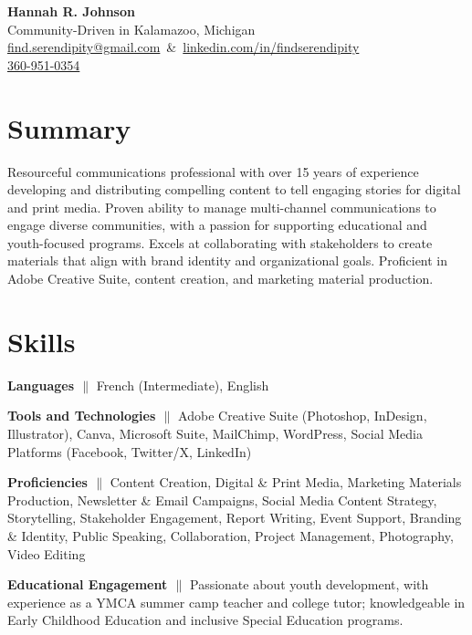 \documentclass[a4paper,12pt]{article} %
\begin{document}
      \begin{center} %
      {\LARGE \textbf{Hannah R. Johnson}} \\
      Community-Driven in Kalamazoo, Michigan \\
      \mbox{\href{mailto:find.serendipity@gmail.com}{find.serendipity@gmail.com} \&
            \href{https://www.linkedin.com/in/findserendipity/}{linkedin.com/in/findserendipity}}\\
      \href{tel:360-951-0354}{360-951-0354}

\end{center}

\section{Summary }
\noindent
Resourceful communications professional with over 15 years of experience developing and distributing compelling content to tell engaging stories for digital and print media. Proven ability to manage multi-channel communications to engage diverse communities, with a passion for supporting educational and youth-focused programs. Excels at collaborating with stakeholders to create materials that align with brand identity and organizational goals. Proficient in Adobe Creative Suite, content creation, and marketing material production.

\section{Skills}
\textbf{Languages {$\parallel$}} \small{{ French (Intermediate), English }}

\textbf{Tools and Technologies {$\parallel$}} \small{{ Adobe Creative Suite (Photoshop, InDesign, Illustrator), Canva, Microsoft Suite, MailChimp, WordPress, Social Media Platforms (Facebook, Twitter/X, LinkedIn)}}

\textbf{Proficiencies {$\parallel$}} \small{{ Content Creation, Digital \& Print Media, Marketing Materials Production, Newsletter \& Email Campaigns, Social Media Content Strategy, Storytelling, Stakeholder Engagement, Report Writing, Event Support, Branding \& Identity, Public Speaking, Collaboration, Project Management, Photography, Video Editing }}

\textbf{Educational Engagement {$\parallel$}} \small{{ Passionate about youth development, with experience as a YMCA summer camp teacher and college tutor; knowledgeable in Early Childhood Education and inclusive Special Education programs.}}
\end{document}
